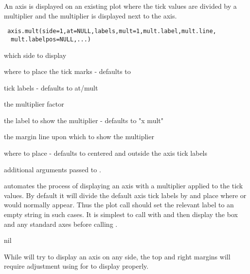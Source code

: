 \begin{Description}\relax
An axis is displayed on an existing plot where the tick values are divided
by a multiplier and the multiplier is displayed next to the axis.
\end{Description}
\begin{Usage}
\begin{verbatim}
 axis.mult(side=1,at=NULL,labels,mult=1,mult.label,mult.line,
  mult.labelpos=NULL,...)
\end{verbatim}
\end{Usage}
\begin{Arguments}
\begin{ldescription}
\item[\code{side}] which side to display
\item[\code{at}] where to place the tick marks - defaults to 
\item[\code{labels}] tick labels - defaults to at/mult
\item[\code{mult}] the multiplier factor
\item[\code{mult.label}] the label to show the multiplier - defaults to "x mult"
\item[\code{mult.line}] the margin line upon which to show the multiplier
\item[\code{mult.labelpos}] where to place  - defaults to centered
and outside the axis tick labels
\item[\code{...}] additional arguments passed to .
\end{ldescription}
\end{Arguments}
\begin{Details}\relax
{} automates the process of displaying an axis with a 
multiplier applied to the tick values. By default it will divide the
default axis tick labels by  and place 
where  or  would normally appear. Thus the plot
call should set the relevant label to an empty string in such cases.
It is simplest to call  with  and then 
display the box and any standard axes before calling .
\end{Details}
\begin{Value}
nil
\end{Value}
\begin{Note}\relax
While  will try to display an axis on any side, the top
and right margins will require adjustment using  for
 to display properly.
\end{Note}
